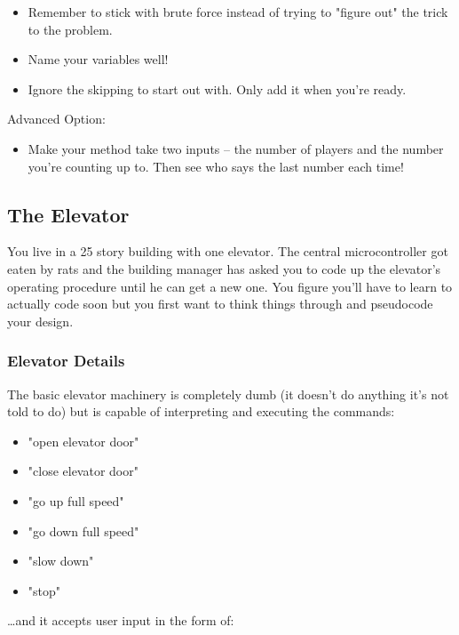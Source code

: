 \documentclass[11pt]{article}
\begin{document}
\begin{itemize}
\item Remember to stick with brute force instead of trying to "figure out" the 
trick to the problem.
\item Name your variables well!
\item Ignore the skipping to start out with. Only add it when you're ready.
\end{itemize}


Advanced Option:

\begin{itemize}
\item Make your method take two inputs -- the number of players and the number 
you're counting up to. Then see who says the last number each time!
\end{itemize}




\subsection{The Elevator}
\label{sec-2-1}

You live in a 25 story building with one elevator. The central 
microcontroller got eaten by rats and the building manager has asked you to 
code up the elevator's operating procedure until he can get a new one. You 
figure you'll have to learn to actually code soon but you first want to think
things through and pseudocode your design.

\subsubsection{Elevator Details}
\label{sec-2-1-1}

The basic elevator machinery is completely dumb (it doesn't do anything it's
not told to do) but is capable of interpreting and executing the commands:

\begin{itemize}
\item "open elevator door"
\item "close elevator door"
\item "go up full speed"
\item "go down full speed"
\item "slow down"
\item "stop"
\end{itemize}


\ldots{}and it accepts user input in the form of:
\end{document}
